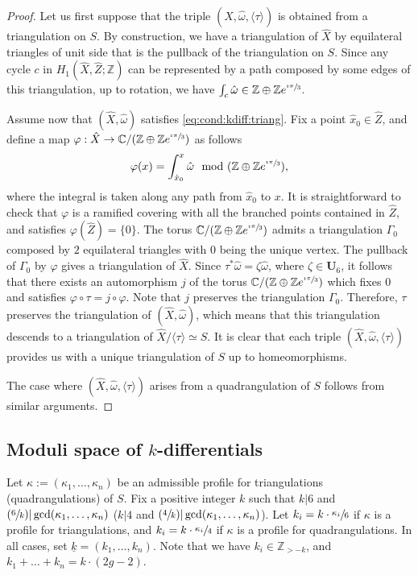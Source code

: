 \documentclass[10pt]{amsart}
\newcommand{\Psfrac}[2]{(\sfrac{#1}{#2})}
\theoremstyle{plain}
\theoremstyle{definition}
\def\C{\mathbb{C}}
\newcommand\Z{\mathbb{Z}}
\newcommand{\Ub}{\mathbf{U}}
\newcommand{\hx}{\hat{x}}
\newcommand{\hZ}{\hat{Z}}
\newcommand{\homg}{\hat{\omega}}
\let\G\Gamma
\let\ul\underline
\begin{document}
\begin{proof}
Let us first suppose that the triple $(\hat{X},\hat{\omega},\langle\tau\rangle)$ is obtained from a triangulation on $S$. By construction, we have a triangulation of $\hat{X}$ by equilateral triangles of unit side that is the pullback of the triangulation on $S$. Since any cycle $c$ in $H_1(\hat{X},\hat{Z};\Z)$ can be represented by a path composed by some edges of this triangulation, up to rotation, we have $\int_c\homg \in \Z\oplus\Z e^{\sfrac{\imath\pi}{3}}$.

Assume now that $(\hat{X},\hat{\omega})$ satisfies \eqref{eq:cond:kdiff:triang}. Fix a point $\hx_0 \in \hZ$, and define a map $\varphi: \hat{X} \to \C/(\Z\oplus\Z e^{\sfrac{\imath\pi}{3}})$ as follows
\[
\varphi(x)=\int_{\hat{x}_0}^x \hat{\omega} \mod (\Z\oplus\Z e^{\sfrac{\imath\pi}{3}}),
\]
where the integral is taken along any path from $\hat{x}_0$ to $x$.
It is straightforward to check that $\varphi$ is a ramified covering with all the branched points contained in $\hat{Z}$, and satisfies $\varphi(\hat{Z})=\{0\}$.
The torus $\C/(\Z\oplus\Z e^{\sfrac{\imath\pi}{3}})$ admits a triangulation $\G_0$ composed by $2$ equilateral triangles with $0$ being the unique vertex.
The pullback of $\G_0$ by $\varphi$ gives a triangulation of $\hat{X}$.
Since $\tau^*\hat{\omega}=\zeta\hat{\omega}$, where $\zeta \in \Ub_6$, it follows that there exists an automorphism $j$ of the torus $\C/(\Z\oplus\Z e^{\sfrac{\imath\pi}{3}})$ which fixes $0$ and satisfies $\varphi\circ\tau=j\circ\varphi$. Note that $j$ preserves the triangulation $\G_0$.
Therefore, $\tau$ preserves the triangulation of $(\hat{X},\hat{\omega})$, which means that
this triangulation descends to a triangulation of $\hat{X}/\langle \tau \rangle\simeq S$.
It is clear that each triple $(\hat{X},\hat{\omega},\langle \tau \rangle)$ provides us with a unique triangulation of $S$ up to homeomorphisms.

The case where $(\hat{X},\hat{\omega},\langle \tau \rangle)$ arises from a quadrangulation of $S$ follows from similar arguments.
\end{proof}

\subsection{Moduli space of $k$-differentials}\label{sec:mod:sp:kdiff}
Let $\kappa:=(\kappa_1,\dots,\kappa_n)$ be an admissible profile for triangulations (\resp quadrangulations) of $S$. Fix a positive integer $k$ such that $k|6$ and $\Psfrac{6}{k} | \gcd(\kappa_1,\dots,\kappa_n)$ (\resp $k | 4$ and $\Psfrac{4}{k} | \gcd(\kappa_1,\dots,\kappa_n)$). Let $k_i=k\cdot\sfrac{\kappa_i}{6}$ if $\kappa$ is a profile for triangulations, and $k_i=k\cdot\sfrac{\kappa_i}{4}$ if $\kappa$ is a profile for quadrangulations. In all cases, set $\ul{k}=(k_1,\dots,k_n)$.
Note that we have $k_i\in \Z_{>-k}$, and $k_1+\dots+k_n=k\cdot(2g-2)$.
\end{document}
